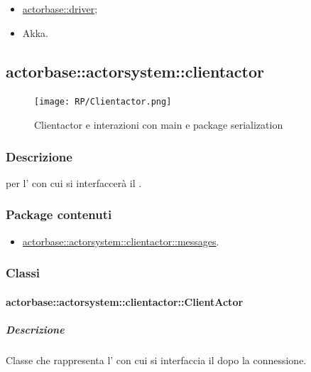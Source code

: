 \documentclass{scalatekids-article}
\begin{document}
\begin{itemize}
\item \hyperref[sec:actorbase::driver]{actorbase::driver};
\item Akka.
\end{itemize}

\subsection{actorbase::actorsystem::clientactor}
\label{sec:actorbase::actorsystem::clientactor}

\begin{figure}[H]
  \begin{center}
    \texttt{[image: RP/Clientactor.png]}
    \caption{Clientactor e interazioni con main e package serialization}
  \end{center}
\end{figure}

\subsubsection{Descrizione}

 per l' con cui si interfaccerà il .

\subsubsection{Package contenuti}

\begin{itemize}
\item \hyperref[sec:actorbase::actorsystem::clientactor::messages]{actorbase::actorsystem::clientactor::messages}.
\end{itemize}

\subsubsection{Classi}

\paragraph{actorbase::actorsystem::clientactor::ClientActor}
\label{sec:actorbase::actorsystem::clientactor::ClientActor}

\subparagraph{Descrizione}

Classe che rappresenta l' con cui si interfaccia il  dopo
la connessione.
\end{document}
